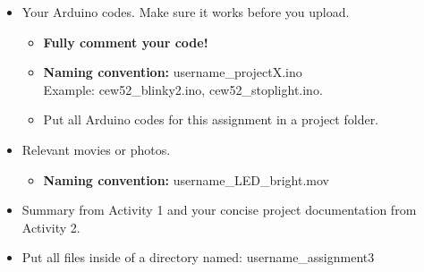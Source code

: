 \documentclass[10pt]{article}
\begin{document}
\begin{itemize}
	\item Your Arduino codes. Make sure it works before you upload.
	\begin{itemize}
		\item \textbf{Fully comment your code!} 
		\item \textbf{Naming convention:} username\_projectX.ino\\
		Example: cew52\_blinky2.ino, cew52\_stoplight.ino.
		\item Put all Arduino codes for this assignment in a project folder. 
	\end{itemize}

	\item Relevant movies or photos.
	\begin{itemize}
		\item \textbf{Naming convention:} username\_LED\_bright.mov
	\end{itemize}
	\item Summary from Activity 1 and your concise project documentation from Activity 2.
	\item Put all files inside of a directory named: username\_assignment3
\end{itemize}

\end{document}
